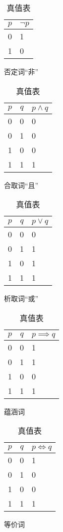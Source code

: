 \begin{table}[ht]
	\centering
	\begin{subtable}[ht]{0.9\textwidth}
		\centering
		\begin{tabular}{|c|p{1.5cm}|}
			\hline
			\(p\) & \(\neg p\) \\ \hline
			0 & 1 \\ \hline
			1 & 0 \\ \hline
		\end{tabular}
		\caption{否定词“非”}
	\end{subtable}

	\begin{subtable}[ht]{0.45\textwidth}
		\centering
		\begin{tabular}{|*{2}{c|}p{2cm}|}
			\hline
			\(p\) & \(q\) & \(p \land q\) \\ \hline
			0 & 0 & 0 \\ \hline
			0 & 1 & 0 \\ \hline
			1 & 0 & 0 \\ \hline
			1 & 1 & 1 \\ \hline
		\end{tabular}
		\caption{合取词“且”}
	\end{subtable}
	\begin{subtable}[ht]{0.45\textwidth}
		\centering
		\begin{tabular}{|*{2}{c|}p{2cm}|}
			\hline
			\(p\) & \(q\) & \(p \lor q\) \\ \hline
			0 & 0 & 0 \\ \hline
			0 & 1 & 1 \\ \hline
			1 & 0 & 1 \\ \hline
			1 & 1 & 1 \\ \hline
		\end{tabular}
		\caption{析取词“或”}
	\end{subtable}

	\begin{subtable}[ht]{0.45\textwidth}
		\centering
		\begin{tabular}{|*{2}{c|}p{2cm}|}
			\hline
			\(p\) & \(q\) & \(p \implies q\) \\ \hline
			0 & 0 & 1 \\ \hline
			0 & 1 & 1 \\ \hline
			1 & 0 & 0 \\ \hline
			1 & 1 & 1 \\ \hline
		\end{tabular}
		\caption{蕴涵词}
	\end{subtable}
	\begin{subtable}[ht]{0.45\textwidth}
		\centering
		\begin{tabular}{|*{2}{c|}p{2cm}|}
			\hline
			\(p\) & \(q\) & \(p \iff q\) \\ \hline
			0 & 0 & 1 \\ \hline
			0 & 1 & 0 \\ \hline
			1 & 0 & 0 \\ \hline
			1 & 1 & 1 \\ \hline
		\end{tabular}
	\caption{等价词}
	\end{subtable}
	\caption{真值表}
\end{table}

